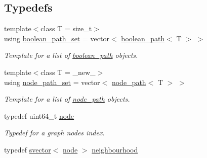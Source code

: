 \subsection*{Typedefs}
\begin{DoxyCompactItemize}
\item 
{\footnotesize template$<$class T  = size\+\_\+t$>$ }\\using \hyperlink{namespacelgraph_1_1utils_aaf50131e15d771a45620336d6e7a77f8}{boolean\+\_\+path\+\_\+set} = vector$<$ \hyperlink{classlgraph_1_1utils_1_1boolean__path}{boolean\+\_\+path}$<$ T $>$ $>$\hypertarget{namespacelgraph_1_1utils_aaf50131e15d771a45620336d6e7a77f8}{}\label{namespacelgraph_1_1utils_aaf50131e15d771a45620336d6e7a77f8}

\begin{DoxyCompactList}\small\item\em Template for a list of \hyperlink{classlgraph_1_1utils_1_1boolean__path}{boolean\+\_\+path} objects. \end{DoxyCompactList}\item 
{\footnotesize template$<$class T  = \+\_\+new\+\_\+$>$ }\\using \hyperlink{namespacelgraph_1_1utils_a723c115f9865edfab11a90377b9abef4}{node\+\_\+path\+\_\+set} = vector$<$ \hyperlink{classlgraph_1_1utils_1_1node__path}{node\+\_\+path}$<$ T $>$ $>$\hypertarget{namespacelgraph_1_1utils_a723c115f9865edfab11a90377b9abef4}{}\label{namespacelgraph_1_1utils_a723c115f9865edfab11a90377b9abef4}

\begin{DoxyCompactList}\small\item\em Template for a list of \hyperlink{classlgraph_1_1utils_1_1node__path}{node\+\_\+path} objects. \end{DoxyCompactList}\item 
typedef uint64\+\_\+t \hyperlink{namespacelgraph_1_1utils_a7bd66ede3805ef121bc2835bd48de0cf}{node}\hypertarget{namespacelgraph_1_1utils_a7bd66ede3805ef121bc2835bd48de0cf}{}\label{namespacelgraph_1_1utils_a7bd66ede3805ef121bc2835bd48de0cf}

\begin{DoxyCompactList}\small\item\em Typedef for a graph node\textquotesingle{}s index. \end{DoxyCompactList}\item 
typedef \hyperlink{classlgraph_1_1utils_1_1svector}{svector}$<$ \hyperlink{namespacelgraph_1_1utils_a7bd66ede3805ef121bc2835bd48de0cf}{node} $>$ \hyperlink{namespacelgraph_1_1utils_a0f2ef47028a466d26841709e705390ac}{neighbourhood}\hypertarget{namespacelgraph_1_1utils_a0f2ef47028a466d26841709e705390ac}{}\label{namespacelgraph_1_1utils_a0f2ef47028a466d26841709e705390ac}


\end{DoxyCompactItemize}
